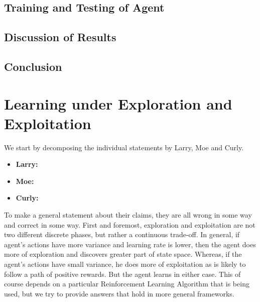 \documentclass{article}
\begin{document}
\subsection{Training and Testing of Agent}

\subsection{Discussion of Results}

\subsection{Conclusion}

\newpage

\section{Learning under Exploration and Exploitation}

We start by decomposing the individual statements by Larry, Moe and Curly. 

\begin{itemize}
\setlength{\itemindent}{-.3in}
  \item \textbf{Larry: }
  \item \textbf{Moe: }
  \item \textbf{Curly: }
\end{itemize}

To make a general statement about their claims, they are all wrong in some way and correct in some way. First and foremost, exploration and exploitation are not two different discrete phases, but rather a continuous trade-off. In general, if agent's actions have more variance and learning rate is lower, then the agent does more of exploration and discovers greater part of state space. Whereas, if the agent's actions have small variance, he does more of exploitation as is likely to follow a path of positive rewards. But the agent learns in either case. This of course depends on a particular Reinforcement Learning Algorithm that is being used, but we try to provide answers that hold in more general frameworks.\\
\end{document}
